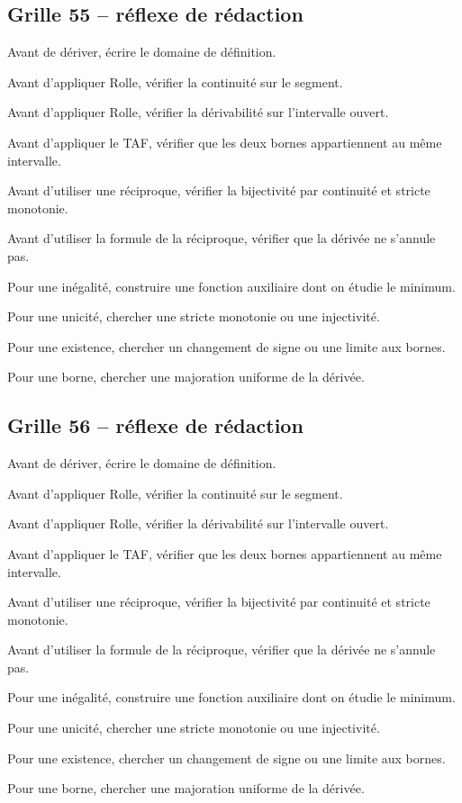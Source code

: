 \documentclass[11pt,a4paper]{article}
\begin{document}
\subsection*{Grille 55 -- réflexe de rédaction}

\begin{methodebox}

Avant de dériver, écrire le domaine de définition.

Avant d'appliquer Rolle, vérifier la continuité sur le segment.

Avant d'appliquer Rolle, vérifier la dérivabilité sur l'intervalle ouvert.

Avant d'appliquer le TAF, vérifier que les deux bornes appartiennent au même intervalle.

Avant d'utiliser une réciproque, vérifier la bijectivité par continuité et stricte monotonie.

Avant d'utiliser la formule de la réciproque, vérifier que la dérivée ne s'annule pas.

Pour une inégalité, construire une fonction auxiliaire dont on étudie le minimum.

Pour une unicité, chercher une stricte monotonie ou une injectivité.

Pour une existence, chercher un changement de signe ou une limite aux bornes.

Pour une borne, chercher une majoration uniforme de la dérivée.

\end{methodebox}

\subsection*{Grille 56 -- réflexe de rédaction}

\begin{methodebox}

Avant de dériver, écrire le domaine de définition.

Avant d'appliquer Rolle, vérifier la continuité sur le segment.

Avant d'appliquer Rolle, vérifier la dérivabilité sur l'intervalle ouvert.

Avant d'appliquer le TAF, vérifier que les deux bornes appartiennent au même intervalle.

Avant d'utiliser une réciproque, vérifier la bijectivité par continuité et stricte monotonie.

Avant d'utiliser la formule de la réciproque, vérifier que la dérivée ne s'annule pas.

Pour une inégalité, construire une fonction auxiliaire dont on étudie le minimum.

Pour une unicité, chercher une stricte monotonie ou une injectivité.

Pour une existence, chercher un changement de signe ou une limite aux bornes.

Pour une borne, chercher une majoration uniforme de la dérivée.

\end{methodebox}
\end{document}
